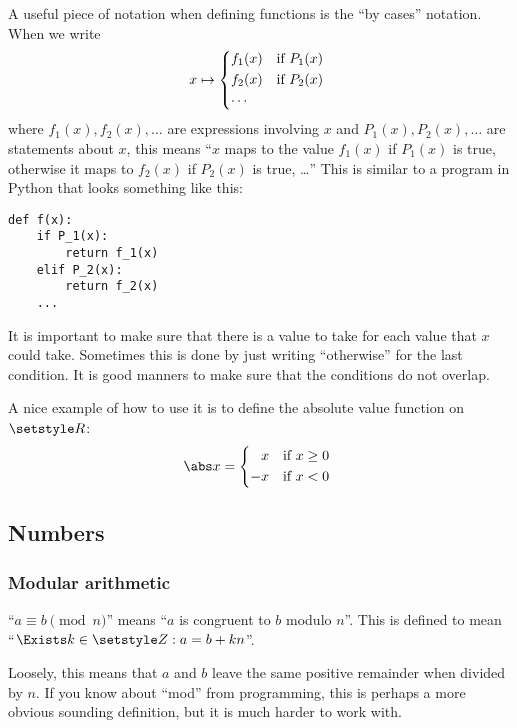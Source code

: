 A useful piece of notation when defining functions is the ``by cases'' notation.
When we write
\begin{equation*}
 x \mapsto
 \begin{cases*}
  f_1(x) & if \(P_1(x)\) \\
  f_2(x) & if \(P_2(x)\) \\
  \dotsb
 \end{cases*}
\end{equation*}
where \(f_1(x), f_2(x), \dotsc\) are expressions involving \(x\) and
\(P_1(x), P_2(x), \dotsc\) are statements about \(x\), this means
``\(x\) maps to the value \(f_1(x)\) if \(P_1(x)\) is true, otherwise it maps to
\(f_2(x)\) if \(P_2(x)\) is true, \dots''
This is similar to a program in Python that looks something like this:
\begin{verbatim}
def f(x):
    if P_1(x):
        return f_1(x)
    elif P_2(x):
        return f_2(x)
    ...
\end{verbatim}
It is important to make sure that there is a value to take for each value that
\(x\) could take. Sometimes this is done by just writing ``otherwise'' for the
last condition. It is good manners to make sure that the conditions do not
overlap.

A nice example of how to use it is to define the absolute value function on
\(\Reals\):
\begin{equation*}
 \abs x =
 \begin{cases*}
  \phantom{-}x & if \(x \ge 0\) \\
  -x & if \(x < 0\)
 \end{cases*}
\end{equation*}

\subsection{Numbers}

\subsubsection{Modular arithmetic}

``\(a \equiv b \pmod n\)'' means ``\(a\) is congruent to \(b\) modulo \(n\)''.
This is defined to mean \\
``\(\Exists k \in \Integers : a = b + kn\)''.

Loosely, this means that \(a\) and \(b\) leave the same positive remainder when
divided by \(n\). If you know about ``mod'' from programming, this is perhaps a
more obvious sounding definition, but it is much harder to work with.

